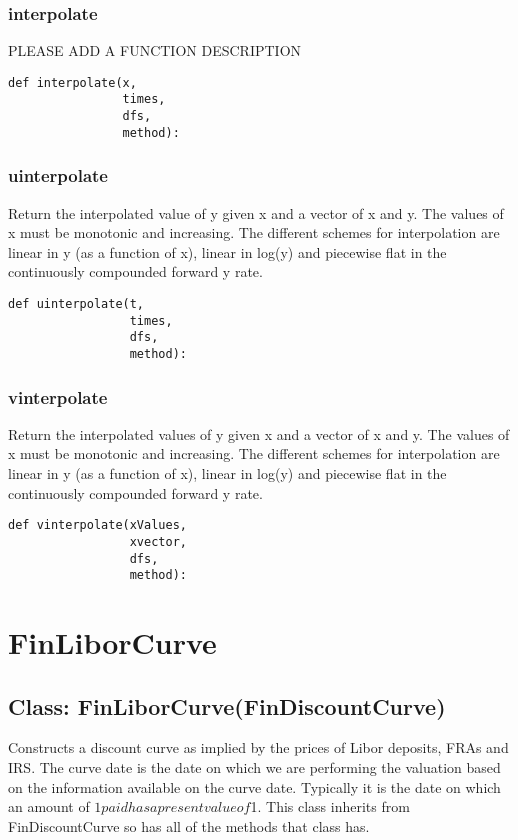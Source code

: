 \documentclass[twoside,11pt]{book}
\begin{document}
\subsubsection*{{\bf interpolate}}
PLEASE ADD A FUNCTION DESCRIPTION

\begin{lstlisting}
def interpolate(x,
                times,
                dfs,
                method):
\end{lstlisting}

\subsubsection*{{\bf uinterpolate}}
Return the interpolated value of y given x and a vector of x and y. The values of x must be monotonic and increasing. The different schemes for interpolation are linear in y (as a function of x), linear in log(y) and piecewise flat in the continuously compounded forward y rate.  

\begin{lstlisting}
def uinterpolate(t,
                 times,
                 dfs,
                 method):
\end{lstlisting}

\subsubsection*{{\bf vinterpolate}}
Return the interpolated values of y given x and a vector of x and y. The values of x must be monotonic and increasing. The different schemes for interpolation are linear in y (as a function of x), linear in log(y) and piecewise flat in the continuously compounded forward y rate.  

\begin{lstlisting}
def vinterpolate(xValues,
                 xvector,
                 dfs,
                 method):
\end{lstlisting}

\newpage
\section{FinLiborCurve}

\subsection*{Class: FinLiborCurve(FinDiscountCurve)}
Constructs a discount curve as implied by the prices of Libor  deposits, FRAs and IRS. The curve date is the date on which we are performing the valuation based on the information available on the curve date. Typically it is the date on which an amount of $1 paid has a present value of $1.  This class inherits from FinDiscountCurve so has all of the methods that class has.  
\end{document}
